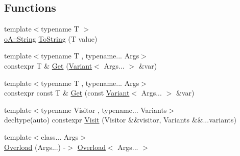 \subsection*{Functions}
\begin{DoxyCompactItemize}
\item 
{\footnotesize template$<$typename T $>$ }\\\mbox{\hyperlink{classo_a_1_1_string}{o\+A\+::\+String}} \mbox{\hyperlink{namespaceo_a_ab2db5fe904e4be44ffb651930b97d482}{To\+String}} (T value)
\item 
{\footnotesize template$<$typename T , typename... Args$>$ }\\constexpr T \& \mbox{\hyperlink{namespaceo_a_ad005adf81258b6620b273f6b58be4a42}{Get}} (\mbox{\hyperlink{namespaceo_a_a46a1498e4e673b19327a24fac0018867}{Variant}}$<$ Args... $>$ \&var)
\item 
{\footnotesize template$<$typename T , typename... Args$>$ }\\constexpr const T \& \mbox{\hyperlink{namespaceo_a_a1d74fafe5226bbc3bc4bcb41f6f24113}{Get}} (const \mbox{\hyperlink{namespaceo_a_a46a1498e4e673b19327a24fac0018867}{Variant}}$<$ Args... $>$ \&var)
\item 
{\footnotesize template$<$typename Visitor , typename... Variants$>$ }\\decltype(auto) constexpr \mbox{\hyperlink{namespaceo_a_a020a0189fb201e2160c2959ddbe0bb7f}{Visit}} (Visitor \&\&visitor, Variants \&\&...variants)
\item 
{\footnotesize template$<$class... Args$>$ }\\\mbox{\hyperlink{namespaceo_a_a503e8d88dbf13dedc19801dafc632979}{Overload}} (Args...) -\/$>$ \mbox{\hyperlink{structo_a_1_1_overload}{Overload}}$<$ Args... $>$
\end{DoxyCompactItemize}
